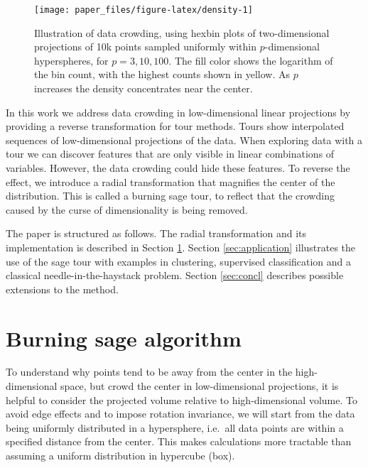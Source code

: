 \documentclass[]{interact}
\theoremstyle{plain}%
\theoremstyle{definition}
\theoremstyle{remark}
\begin{document}
\begin{figure}

{\centering \texttt{[image: paper\_files/figure-latex/density-1]} 

}

\caption{Illustration of data crowding, using hexbin plots of two-dimensional projections of 10k points sampled uniformly within $p$-dimensional hyperspheres, for $p=3, 10, 100$. The fill color shows the logarithm of the bin count, with the highest counts shown in yellow. As $p$ increases the density  concentrates near the center.}\label{fig:density}
\end{figure}

In this work we address data crowding in low-dimensional linear
projections by providing a reverse transformation for tour methods.
Tours show interpolated sequences of low-dimensional projections of the
data. When exploring data with a tour we can discover features that are
only visible in linear combinations of variables. However, the data
crowding could hide these features. To reverse the effect, we introduce
a radial transformation that magnifies the center of the distribution.
This is called a burning sage tour, to reflect that the crowding caused
by the curse of dimensionality is being removed.

The paper is structured as follows. The radial transformation and its
implementation is described in Section \ref{sec:method}. Section
\ref{sec:application} illustrates the use of the sage tour with examples
in clustering, supervised classification and a classical
needle-in-the-haystack problem. Section \ref{sec:concl} describes
possible extensions to the method.

\hypertarget{sec:method}{%
\section{Burning sage algorithm}\label{sec:method}}

To understand why points tend to be away from the center in the
high-dimensional space, but crowd the center in low-dimensional
projections, it is helpful to consider the projected volume relative to
high-dimensional volume. To avoid edge effects and to impose rotation
invariance, we will start from the data being uniformly distributed in a
hypersphere, i.e.~all data points are within a specified distance from
the center. This makes calculations more tractable than assuming a
uniform distribution in hypercube (box).
\end{document}
